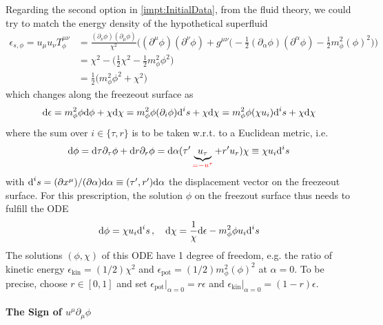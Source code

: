 Regarding the second option in \ref{impt:InitialData}, from the fluid theory, we could try to match the energy density of the hypothetical superfluid
\begin{subequations}
    \begin{align}
        \epsilon_{s,\phi}=u_\mu u_\nu T^{\mu\nu}_{\phi}&=\frac{(\partial_\nu\phi)(\partial_\mu\phi)}{\chi^2}\Big((\partial^\mu\phi)(\partial^\nu\phi)+g^{\mu\nu}\big(-\frac{1}{2}(\partial_\alpha\phi)(\partial^\alpha\phi)-\frac{1}{2}m_\phi^2(\phi)^2\big)\Big)   \\
        &=\chi^2-\big(\frac{1}{2}\chi^2-\frac{1}{2}m_\phi^2\phi^2\big)  \\
        &=\frac{1}{2}\big(m_\phi^2\phi^2+\chi^2\big)
    \end{align}
\end{subequations}
which changes along the freezeout surface as
    \begin{equation}
        \text{d}\epsilon=m_\phi^2\phi\text{d}\phi+\chi\text{d}\chi=m_\phi^2\phi(\partial_i\phi)\text{d}^i s+\chi\text{d}\chi=m_\phi^2\phi(\chi u_i)\text{d}^i s+\chi\text{d}\chi
    \end{equation}
where the sum over $i\in\{\tau,r\}$ is to be taken w.r.t. to a Euclidean metric, i.e.
\begin{equation}
    \text{d}\phi=\text{d}\tau\partial_\tau\phi+\text{d} r\partial_r\phi=\text{d}\alpha(\tau^\prime \underbrace{u_\tau}_{\textcolor{red}{=-u^\tau}}+r^\prime u_r)\chi\equiv\chi u_i\text{d}^is
\end{equation}
with $\text{d}^i s=(\partial x^\mu)/(\partial\alpha)\text{d}\alpha\equiv(\tau^\prime,r^\prime)\text{d}\alpha$ the displacement vector on the freezeout surface. For this prescription, the solution $\phi$ on the freezout surface thus needs to fulfill the ODE
\begin{equation}
    \text{d}\phi=\chi u_i\text{d}^i s\,,\quad
    \text{d}\chi=\frac{1}{\chi}\text{d}\epsilon-m_\phi^2\phi u_i\text{d}^i s
\end{equation}
The solutions $(\phi,\chi)$ of this ODE have 1 degree of freedom, e.g. the ratio of kinetic energy $\epsilon_{\text{kin}}=(1/2)\chi^2$ and $\epsilon_{\text{pot}}=(1/2)m_\phi^2(\phi)^2$ at $\alpha=0$. To be precise, choose $r\in[0,1]$ and set $\epsilon_{\text{pot}}\big\vert_{\alpha=0}=r\epsilon$ and $\epsilon_{\text{kin}}\big\vert_{\alpha=0}=(1-r)\epsilon$.

\paragraph{The Sign of $u^\mu\partial_\mu\phi$}

